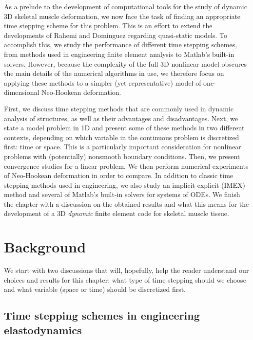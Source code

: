 \documentclass{sfuthesis}
\numberwithin{equation}{section}
\numberwithin{figure}{chapter}
\numberwithin{table}{chapter}
\theoremstyle{definition}
\begin{document}
As a prelude to the development of computational tools for the study of dynamic 3D skeletal muscle deformation, we now face the task of finding an appropriate time stepping scheme for this problem. This is an effort to extend the developments of Rahemi \cite{Hadi} and Dominguez \cite{Seba} regarding quasi-static models.  
To accomplish this, we study the performance of different time stepping schemes, from methods used in engineering finite element analysis to Matlab's built-in solvers. 
However, because the complexity of the full 3D nonlinear model obscures the main details of the numerical algorithms in use, we therefore focus on applying these methods to a simpler (yet representative) model of one-dimensional Neo-Hookean deformation.

First, we discuss time stepping methods that are commonly used in dynamic analysis of structures, as well as their advantages and disadvantages. Next, we state a model problem in 1D and present some of these methods in two different contexts, depending on which variable in the continuous problem is discretized first: time or space. This is a particularly important consideration for nonlinear problems with (potentially) nonsmooth boundary conditions. Then, we present convergence studies for a linear problem. We then perform numerical experiments of Neo-Hookean deformation in order to compare. In addition to classic time stepping methods used in engineering, we also study an implicit-explicit (IMEX) method and several of Matlab's built-in solvers for systems of ODEs. We finish the chapter with a discussion on the obtained results and what this means for the development of a 3D \textit{dynamic} finite element code for skeletal muscle tissue.

\section{Background}

We start with two discussions that will, hopefully, help the reader understand our choices and results for this chapter: what type of time stepping should we choose and what variable (space or time) should be discretized first.

\subsection{Time stepping schemes in engineering elastodynamics}
\end{document}
